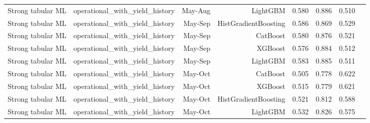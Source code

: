 \begin{tabular}{llrrrrrr}
Strong tabular ML & operational\_with\_yield\_history & May-Aug & LightGBM & 0.580 & 0.886 & 0.510 \\
Strong tabular ML & operational\_with\_yield\_history & May-Sep & HistGradientBoosting & 0.586 & 0.869 & 0.529 \\
Strong tabular ML & operational\_with\_yield\_history & May-Sep & CatBoost & 0.580 & 0.876 & 0.521 \\
Strong tabular ML & operational\_with\_yield\_history & May-Sep & XGBoost & 0.576 & 0.884 & 0.512 \\
Strong tabular ML & operational\_with\_yield\_history & May-Sep & LightGBM & 0.583 & 0.885 & 0.511 \\
Strong tabular ML & operational\_with\_yield\_history & May-Oct & CatBoost & 0.505 & 0.778 & 0.622 \\
Strong tabular ML & operational\_with\_yield\_history & May-Oct & XGBoost & 0.515 & 0.779 & 0.621 \\
Strong tabular ML & operational\_with\_yield\_history & May-Oct & HistGradientBoosting & 0.521 & 0.812 & 0.588 \\
Strong tabular ML & operational\_with\_yield\_history & May-Oct & LightGBM & 0.532 & 0.826 & 0.575 \\
\bottomrule
\end{tabular}
